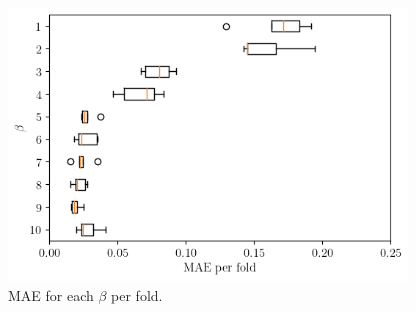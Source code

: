 \begin{figure}[H]
    \centering
    \includegraphics[width=300pt]{files/mae_folds.png}
    \caption{MAE for each $\beta$ per fold.}
    \label{fig:fold-mae}
\end{figure}

